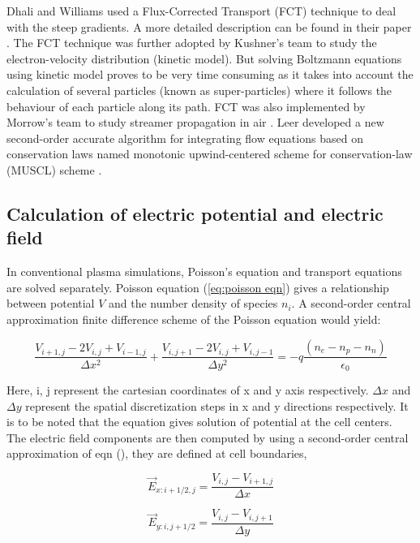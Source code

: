 \documentclass[paper=a4, fontsize=13pt]{scrartcl}
\begin{document}
Dhali and Williams used a Flux-Corrected Transport (FCT) technique to deal with the steep gradients. A more detailed description can be found in their paper \cite{Dhali1987TwodimensionalGases}. The FCT technique was further adopted by Kushner's team \cite{DiCarlo1989SolvingTransport} to study the electron-velocity distribution (kinetic model). But solving Boltzmann equations using kinetic model proves to be very time consuming as it takes into account the calculation of several particles (known as super-particles) where it follows the behaviour of each particle along its path. FCT was also implemented by Morrow's team to study streamer propagation in air \cite{Morrow1997StreamerAir}. Leer developed a new second-order accurate algorithm for integrating flow equations based on conservation laws named monotonic upwind-centered scheme for conservation-law (MUSCL) scheme \cite{vanLeer1979TowardsMethod}. 



\subsection{Calculation of electric potential and electric field}

In conventional plasma simulations, Poisson's equation and transport equations are solved separately. Poisson equation (\ref{eq:poisson eqn}) gives a relationship between potential $V$ and the number density of species $n_i$. A second-order central approximation finite difference scheme of the Poisson equation would yield:

\begin{equation}
\frac{V_{i+1,j} - 2 V_{i,j} + V_{i-1,j} }{\Delta x^2} + \frac{V_{i,j+1} - 2 V_{i,j} + V_{i,j-1} }{\Delta y^2} = -q\frac{(n_e - n_p - n_n)}{\epsilon_0}
\end{equation}

Here, i, j represent the cartesian coordinates of x and y axis respectively. $\Delta x$ and $\Delta y$ represent the spatial discretization steps in x and y directions respectively. It is to be noted that the equation gives solution of potential at the cell centers. The electric field components are then computed by using a second-order central approximation of eqn (), they are defined at cell boundaries,

\begin{equation}
\vec{E}_{x:i+1/2,j} = \frac{V_{i,j} - V_{i+1,j}}{\Delta x}
\end{equation}

\begin{equation}
\vec{E}_{y:i,j+1/2} = \frac{V_{i,j} - V_{i,j+1}}{\Delta y}
\end{equation}
\end{document}
